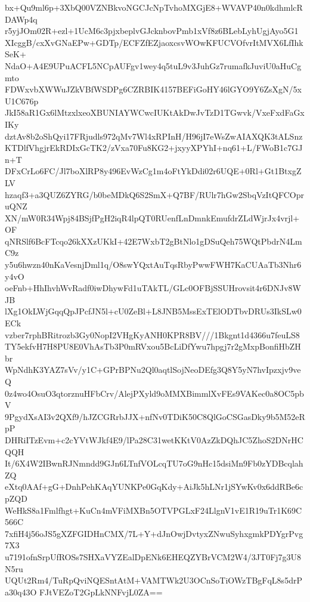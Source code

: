 bx+Qu9ml6p+3XbQ00VZNBkvoNGCJcNpTvhoMXGjE8+WVAVP40n0kdhmlcRDAWp4q
r5yjJOm02R+ezl+1UcM6c3pjxbeplvGJcknbovPmb1xVf8z6BLebLyhUgjAyo5G1
XIcggB/cxXvGNaEPw+GDTp/ECFZfEZjaoxcsvWOwKFUCVOfvrItMVX6LfIhkSeK+
NdaO+A4E9UPuACFL5NCpAUFgv1wey4q5tuL9v3JuhGz7rumafkJuviU0aHuCgmto
FDWxvbXWWuJZkVBfWSDPg6CZRBIK4157BEFiGoHY46lGYO9Y6ZsXgN/5xU1C676p
JkI58aR1Gx6lMtzxlxeoXBUNIAYWCwcIUKtAkDwJvTzD1TGwvk/VxeFxdFaGxIKy
dztAv8b2oShQyi17FRjudls972qMv7Wl4xRPInH/H96jI7eWsZwAIAXQK3tALSnz
KTDlfVhgjrEkRDIxGcTK2/zVxa70Fu8KG2+jxyyXPYhI+nq61+L/FWoB1c7GJn+T
DFxCrLo6FC/Jl7boXlRP8y496EvWzCg1m4oFtYkDdi02r6UQE+0Rl+Gt1BtxgZLV
hzaqf3+a3QUZ6ZYRG/b0beMDkQ6S2SmX+Q7BF/RUlr7hGw2SbqVzItQFCOpruQNZ
XN/mW0R34Wpj84BSjfPgH2iqR4lpQT0RUenfLnDmnkEmufdrZLdWjrJx4vrjl+OF
qNRSlf6BcFTcqo26kXXzUKkI+42E7WxbT2gBtNlo1gDSuQeh75WQtPbdrN4LmC9z
y5u6hwzn40nKaVesnjDml1q/O8swYQxtAuTqsRbyPwwFWH7KaCUAaTb3Nhr6y4vO
oeFnb+HhIhvhWvRadf0iwDhywFd1uTAkTL/GLc0OFBjSSUHrovsit4r6DNJv8WJB
lXg1OkLWjGqqQpJPcfJN5l+cU0ZeBl+L8JNB5MssExTElODTbvDRUs3IkSLw0ECk
vzber7rphBRitrozb3Gy0NopI2VHgKyANH0KPR8BV///1Bkgnt1d4366u7feuLS8
TY5ekfvH7H8PU8E0VhAsTb3P0mRVxou5BcLiDfYwu7hpgj7r2gMxpBonfiHbZHbr
WpNdhK3YAZ7sVv/y1C+GPrBPNu2Ql0aqtlSojNeoDEfg3Q8Y5yN7hvIpzxjv9veQ
0z4wo4OsuO3qtorznuHFbCrv/AlejPXyld9oMMXBimmlXvFEs9VAKec0a8OC5pbV
9PgydXsAI3v2QXf9/hJZCGRrbJJX+nfNv0TDiK50C8QlGoCSGasDky9b5M52eRpP
DHRiITzEvm+c2cYVtWJkf4E9/lPa28C31wetKKtV0AzZkDQhJC5ZhoS2DNrHCQQH
It/6X4W2IBwnRJNmndd9GJn6LTnfVOLcqTU7oG9nHc15dsiMn9Fb0zYDBcqlahZQ
eXtq0AAf+gG+DnhPehKAqYUNKPe0GqKdy+AiJk5hLNr1jSYwKv0x6ddRBe6cpZQD
WeHkS8a1Fmlfhgt+KuCn4mVFiMXBn5OTVPGLxF24LlgnV1vE1R19uTr1K69C566C
7xfiH4j56oJS5gXZFGIDHnCMX/7L+Y+dJnOwjDvtyxZNwuSyhxgmkPDYgrPvg7X3
u7191ofnSrpUfROSs7SHXaVYZEalDpENk6EHEQZYBrVCM2W4/3JT0Fj7g3U8N5ru
UQUt2Rm4/TuRpQviNQESntAtM+VAMTWk2U3OCnSoTiOWzTBgFqL8s5drPa30q43O
FJtVEZoT2GpLkNNFvjL0ZA==
